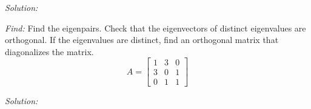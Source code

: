 \documentclass[11pt]{homework}
\begin{document}
\emph{Solution:}
\newline

\question
\emph{Find:}
\newline
Find the eigenpairs.
Check that the eigenvectors of distinct eigenvalues are orthogonal.
If the eigenvalues are distinct, find an orthogonal matrix that diagonalizes the matrix.
\begin{equation*}
A = 
  \begin{bmatrix}
  1 & 3 & 0 \\
  3 & 0 & 1 \\
  0 & 1 & 1
  \end{bmatrix}
\end{equation*}

\emph{Solution:}
\newline
\end{document}
